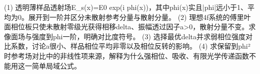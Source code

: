 (1) 透明薄样品透射场E_s(x)=E0 exp(i phi(x))，其中phi(x)实且|phi|远小于1、平均为0。展开到一阶并区分未散射参考分量与散射分量。
(2) 理想4f系统的傅里叶面相位板只使未散射零级光获得相移delta、振幅透过因子a>0，散射分量不变。求像面场与强度到phi一阶，明确对比度符号。
(3) 选择最优delta并求弱相位强度对比系数，讨论a很小、样品相位平均非零以及相位反转的影响。
(4) 求保留到phi²时参考场对比中的非线性项来源，解释为什么强相位、吸收、有限光学传递函数不能用这一简单局域公式。

